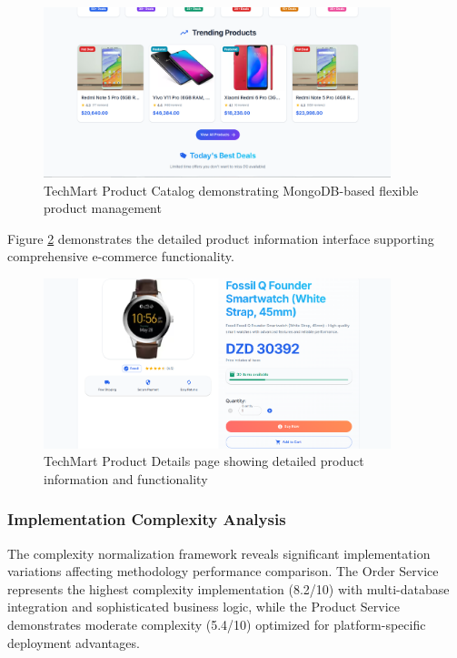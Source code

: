 \begin{figure}[H]
\centering
\includegraphics[width=0.9\textwidth]{figures/chapter5/techmart-products-catalog.png}
\caption{TechMart Product Catalog demonstrating MongoDB-based flexible product management}
\label{fig:techmart-products-catalog}
\end{figure}

Figure \ref{fig:techmart-product-details} demonstrates the detailed product information interface supporting comprehensive e-commerce functionality.

\begin{figure}[H]
\centering
\includegraphics[width=0.9\textwidth]{figures/chapter5/techmart-product-details.png}
\caption{TechMart Product Details page showing detailed product information and functionality}
\label{fig:techmart-product-details}
\end{figure}


\subsubsection{Implementation Complexity Analysis}

The complexity normalization framework reveals significant implementation variations affecting methodology performance comparison. The Order Service represents the highest complexity implementation (8.2/10) with multi-database integration and sophisticated business logic, while the Product Service demonstrates moderate complexity (5.4/10) optimized for platform-specific deployment advantages.

